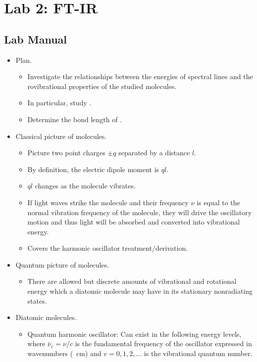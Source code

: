 \documentclass[../notes.tex]{subfiles}
\begin{document}
\section{Lab 2: FT-IR}
\subsection*{Lab Manual}
\begin{itemize}
    \item Plan.
    \begin{itemize}
        \item Investigate the relationships between the energies of spectral lines and the rovibrational properties of the studied molecules.
        \item In particular, study .
        \item Determine the bond length of .
    \end{itemize}
    \item Classical picture of molecules.
    \begin{itemize}
        \item Picture two point charges $\pm q$ separated by a distance $l$.
        \item By definition, the electric dipole moment is $ql$.
        \item $ql$ changes as the molecule vibrates.
        \item If light waves strike the molecule and their frequency $\nu$ is equal to the normal vibration frequency of the molecule, they will drive the oscillatory motion and thus light will be absorbed and converted into vibrational energy.
        \item Covers the harmonic oscillator treatment/derivation.
    \end{itemize}
    \item Quantum picture of molecules.
    \begin{itemize}
        \item There are allowed but discrete amounts of vibrational and rotational energy which a diatomic molecule may have in its stationary nonradiating states.
    \end{itemize}
    \item Diatomic molecules.
    \begin{itemize}
        \item Quantum harmonic oscillator: Can exist in the following energy levels, where $\bar{\nu}_e=\nu/c$ is the fundamental frequency of the oscillator expressed in wavenumbers (\si{\per\centi\meter}) and $v=0,1,2,\dots$ is the vibrational quantum number.

\end{itemize}
\end{itemize}
\end{document}
